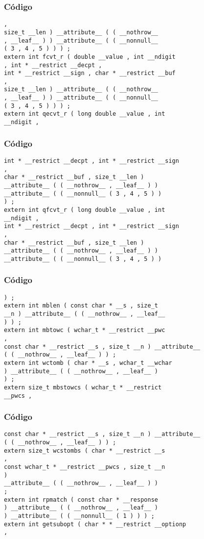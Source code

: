 \documentclass{beamer}
\begin{document}
\begin{frame}[fragile]
\frametitle{C\'odigo}
\begin{verbatim}
, 
size_t __len ) __attribute__ ( ( __nothrow__ 
, __leaf__ ) ) __attribute__ ( ( __nonnull__ 
( 3 , 4 , 5 ) ) ) ; 
extern int fcvt_r ( double __value , int __ndigit 
, int * __restrict __decpt , 
int * __restrict __sign , char * __restrict __buf 
, 
size_t __len ) __attribute__ ( ( __nothrow__ 
, __leaf__ ) ) __attribute__ ( ( __nonnull__ 
( 3 , 4 , 5 ) ) ) ; 
extern int qecvt_r ( long double __value , int 
__ndigit , 
\end{verbatim}
\end{frame}
\begin{frame}[fragile]
\frametitle{C\'odigo}
\begin{verbatim}
int * __restrict __decpt , int * __restrict __sign 
, 
char * __restrict __buf , size_t __len ) 
__attribute__ ( ( __nothrow__ , __leaf__ ) ) 
__attribute__ ( ( __nonnull__ ( 3 , 4 , 5 ) ) 
) ; 
extern int qfcvt_r ( long double __value , int 
__ndigit , 
int * __restrict __decpt , int * __restrict __sign 
, 
char * __restrict __buf , size_t __len ) 
__attribute__ ( ( __nothrow__ , __leaf__ ) ) 
__attribute__ ( ( __nonnull__ ( 3 , 4 , 5 ) ) 
\end{verbatim}
\end{frame}
\begin{frame}[fragile]
\frametitle{C\'odigo}
\begin{verbatim}
) ; 
extern int mblen ( const char * __s , size_t 
__n ) __attribute__ ( ( __nothrow__ , __leaf__ 
) ) ; 
extern int mbtowc ( wchar_t * __restrict __pwc 
, 
const char * __restrict __s , size_t __n ) __attribute__ 
( ( __nothrow__ , __leaf__ ) ) ; 
extern int wctomb ( char * __s , wchar_t __wchar 
) __attribute__ ( ( __nothrow__ , __leaf__ ) 
) ; 
extern size_t mbstowcs ( wchar_t * __restrict 
__pwcs , 
\end{verbatim}
\end{frame}
\begin{frame}[fragile]
\frametitle{C\'odigo}
\begin{verbatim}
const char * __restrict __s , size_t __n ) __attribute__ 
( ( __nothrow__ , __leaf__ ) ) ; 
extern size_t wcstombs ( char * __restrict __s 
, 
const wchar_t * __restrict __pwcs , size_t __n 
) 
__attribute__ ( ( __nothrow__ , __leaf__ ) ) 
; 
extern int rpmatch ( const char * __response 
) __attribute__ ( ( __nothrow__ , __leaf__ ) 
) __attribute__ ( ( __nonnull__ ( 1 ) ) ) ; 
extern int getsubopt ( char * * __restrict __optionp 
, 
\end{verbatim}
\end{frame}
\end{document}
